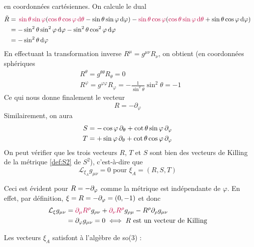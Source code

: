 en coordonnées cartésiennes. On calcule le dual
\begin{align*}
    \tilde R &= \,\textcolor{purple}{\sin{\theta}\sin{\varphi}}(\textcolor{purple}{\cos{\theta} \cos{\varphi}\, \mathrm{d} \theta}- \sin{\theta} \sin{\varphi}\, \mathrm{d} \varphi) - \textcolor{purple}{\sin{\theta}\cos{\varphi}}(\textcolor{purple}{\cos{\theta} \sin{\varphi} \, \mathrm{d} \theta} + \sin{\theta} \cos{\varphi} \, \mathrm{d} \varphi)\\ 
    &= - \sin^2{\theta}\sin^2{\varphi}\, \mathrm{d} \varphi - \sin^2{\theta}\cos^2{\varphi}\, \mathrm{d} \varphi\\
    &= - \sin^2{\theta}\, \mathrm{d} \varphi
\end{align*}
En effectuant la transformation inverse $R^{\mu} = g^{\mu \nu}R_{\nu}$, on obtient (en coordonnées sphériques
\begin{align}
    &R^{\theta} = g^{\theta \theta}R_{\theta} = 0\\
    &R^{\varphi} = g^{\varphi \varphi}R_{\varphi} = -\frac{1}{\sin^2{\theta}}\sin^2{\theta} = -1
\end{align}
Ce qui nous donne finalement le vecteur
\begin{equation}
    R = -\partial_{\varphi}
\end{equation}
Similairement, on aura
\begin{align}
    S &= - \cos \varphi \, \partial_\theta +\cot \theta \sin \varphi \, \partial_\varphi \\
    T &= + \sin \varphi \, \partial_\theta +\cot \theta \cos \varphi \, \partial_\varphi
\end{align}
On peut vérifier que les trois vecteurs $R$, $T$ et $S$  sont bien des vecteurs de Killing de la métrique \ref{def:S2} de $S^2$), c'est-à-dire que 
\begin{equation}
    \label{eq:sym sphérique killing}
    \mathcal{L}_{\xi_A}g_{\mu \nu} = 0 \text{ pour } \xi_A = (R, S, T)
\end{equation}
\begin{rmk}
    Ceci est évident pour $R = - \partial_\varphi$ comme la métrique est indépendante de $\varphi$. En effet, par définition, $\xi = R = -\partial_\varphi = (0,-1)$ et donc
    \begin{align}
        \mathcal{L}_{\xi}g_{\mu \nu} & = \textcolor{purple}{\partial_\mu R^\rho} g_{\rho \nu} +\textcolor{purple}{\partial_\nu R^\rho} g_{\rho \mu} - R^\rho \partial_\rho g_{\mu\nu} \\ 
        &= \partial_\varphi g_{\mu\nu} = 0 \iff \text{$R$ est un vecteur de Killing}
    \end{align}
\end{rmk}
Les vecteurs $\xi_A$ satisfont à l'algèbre de so(3) :
